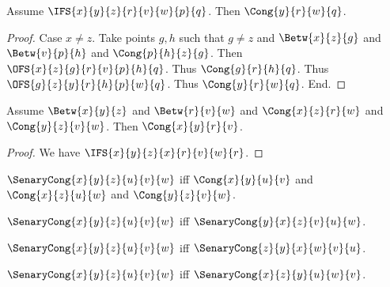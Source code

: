 \documentclass[10pt,a4paper,parskip=half,numbers=endperiod,parskip]{scrartcl}
\begin{document}
  \begin{forthel}
    \begin{lemma} %
      Assume $\IFS{x}{y}{z}{r}{v}{w}{p}{q}$.
      Then $\Cong{y}{r}{w}{q}$.
    \end{lemma}
    \begin{proof}
      Case $x \neq z$.
        Take points $g,h$ such that
        $g \neq z$ and
        $\Betw{x}{z}{g}$ and
        $\Betw{v}{p}{h}$ and
        $\Cong{p}{h}{z}{g}$.
        Then $\OFS{x}{z}{g}{r}{v}{p}{h}{q}$.
        Thus $\Cong{g}{r}{h}{q}$.
        Thus $\OFS{g}{z}{y}{r}{h}{p}{w}{q}$.
        Thus $\Cong{y}{r}{w}{q}$.
      End.
    \end{proof}

  \end{forthel}



  \begin{forthel}
    \begin{lemma} %
      Assume
      $\Betw{x}{y}{z}$ and
      $\Betw{r}{v}{w}$ and
      $\Cong{x}{z}{r}{w}$ and
      $\Cong{y}{z}{v}{w}$.
      Then $\Cong{x}{y}{r}{v}$.
    \end{lemma}
    \begin{proof}
      We have $\IFS{x}{y}{z}{x}{r}{v}{w}{r}$.
    \end{proof}

    \begin{definition} %
      $\SenaryCong{x}{y}{z}{u}{v}{w}$ iff
      $\Cong{x}{y}{u}{v}$ and
      $\Cong{x}{z}{u}{w}$ and
      $\Cong{y}{z}{v}{w}$.
    \end{definition}
  \end{forthel}

  \begin{lemma}
    $\SenaryCong{x}{y}{z}{u}{v}{w}$ iff $\SenaryCong{y}{x}{z}{v}{u}{w}$.
  \end{lemma}

  \begin{lemma}
    $\SenaryCong{x}{y}{z}{u}{v}{w}$ iff $\SenaryCong{z}{y}{x}{w}{v}{u}$.
  \end{lemma}

  \begin{lemma}
    $\SenaryCong{x}{y}{z}{u}{v}{w}$ iff $\SenaryCong{x}{z}{y}{u}{w}{v}$.
  \end{lemma}
\end{document}
